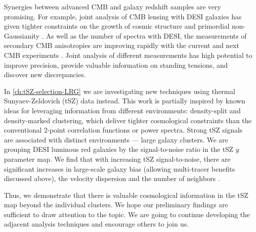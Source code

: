 Synergies between advanced CMB and galaxy redshift samples are very promising.
For example, joint analysis of CMB lensing with DESI galaxies has given tighter constraints on the growth of cosmic structure \citep{ACT-lensingxDESI-LRG-structure-formation-Kim,ACT-lensingxDESI-LRG-structure-formation-Sailer} and primordial non-Gaussianity \citep{DESI-QSOxPlanck-lensing-PNG,DESI-LRGxPlanck-lensing-PNG}.
As well as the number of spectra with DESI, the measurements of secondary CMB anisotropies are improving rapidly with the current and next CMB experiments \citep{ACT-lensing-DR6,ACT-maps-DR6,SO,CMBS4,CMBS4white}.
Joint analysis of different measurements has high potential to improve precision, provide valuable information on standing tensions, and discover new discrepancies.

In \cref{ch:tSZ-selection-LRG} we are investigating new techniques using thermal Sunyaev-Zeldovich (tSZ) data instead.
This work is partially inspired by known ideas for leveraging information from different environments: density-split \citep[e.g.][]{density-split-clustering-constrain-nuLCDM} and density-marked \citep[e.g.][]{density-marked-CF-MG} clustering, which deliver tighter cosmological constraints than the conventional 2-point correlation functions or power spectra.
Strong tSZ signals are associated with distinct environments --- large galaxy clusters.
We are grouping DESI luminous red galaxies \citep{LRG.TS.Zhou.2023} by the signal-to-noise ratio in the tSZ $y$ parameter map.
We find that with increasing tSZ signal-to-noise, there are significant increases in large-scale galaxy bias (allowing multi-tracer benefits discussed above), the velocity dispersion \citep[allowing Finger-of-God mitigation for more precise and robust modeling, e.g.][]{removing-FoG} and the number of neighbors \citep[which could help inform the galaxy multiplet studies, e.g.][]{DESI-galaxy-multiplets-tidal-field}.

Thus, we demonstrate that there is valuable cosmological information in the tSZ map beyond the individual clusters.
We hope our preliminary findings are sufficient to draw attention to the topic.
We are going to continue developing the adjacent analysis techniques and encourage others to join us.